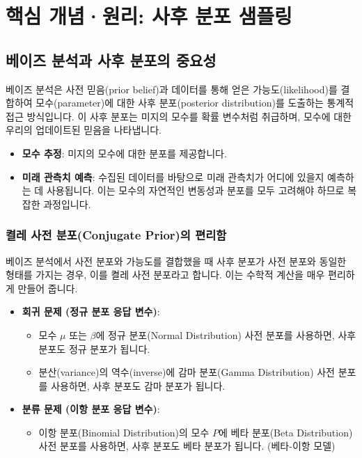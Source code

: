\documentclass[11pt,a4paper]{article}
\theoremstyle{definition}
\newcommand{\newsection}[1]{\newpage\section{#1}}
\begin{document}
\newsection{핵심 개념·원리: 사후 분포 샘플링}

\subsection*{베이즈 분석과 사후 분포의 중요성}
베이즈 분석은 사전 믿음(prior belief)과 데이터를 통해 얻은 가능도(likelihood)를 결합하여 모수(parameter)에 대한 사후 분포(posterior distribution)를 도출하는 통계적 접근 방식입니다. 이 사후 분포는 미지의 모수를 확률 변수처럼 취급하며, 모수에 대한 우리의 업데이트된 믿음을 나타냅니다.

\begin{infobox}[title=사후 분포의 활용]
\begin{itemize}
    \item \textbf{모수 추정}: 미지의 모수에 대한 분포를 제공합니다.
    \item \textbf{미래 관측치 예측}: 수집된 데이터를 바탕으로 미래 관측치가 어디에 있을지 예측하는 데 사용됩니다. 이는 모수의 자연적인 변동성과 분포를 모두 고려해야 하므로 복잡한 과정입니다.
\end{itemize}
\end{infobox}

\subsubsection*{켤레 사전 분포(Conjugate Prior)의 편리함}
베이즈 분석에서 사전 분포와 가능도를 결합했을 때 사후 분포가 사전 분포와 동일한 형태를 가지는 경우, 이를 켤레 사전 분포라고 합니다. 이는 수학적 계산을 매우 편리하게 만들어 줍니다.

\begin{examplebox}[title=켤레 사전 분포의 예시]
\begin{itemize}
    \item \textbf{회귀 문제 (정규 분포 응답 변수)}:
    \begin{itemize}
        \item 모수 $\mu$ 또는 $\beta$에 정규 분포(Normal Distribution) 사전 분포를 사용하면, 사후 분포도 정규 분포가 됩니다.
        \item 분산(variance)의 역수(inverse)에 감마 분포(Gamma Distribution) 사전 분포를 사용하면, 사후 분포도 감마 분포가 됩니다.
    \end{itemize}
    \item \textbf{분류 문제 (이항 분포 응답 변수)}:
    \begin{itemize}
        \item 이항 분포(Binomial Distribution)의 모수 $P$에 베타 분포(Beta Distribution) 사전 분포를 사용하면, 사후 분포도 베타 분포가 됩니다. (베타-이항 모델)
    \end{itemize}
\end{itemize}
\end{examplebox}
\end{document}
